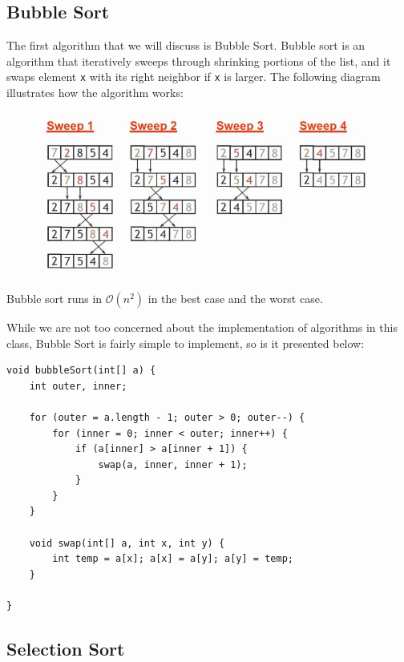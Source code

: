 \newpage

\subsection{Bubble Sort}

The first algorithm that we will discuss is Bubble Sort. Bubble sort is an algorithm that iteratively sweeps through shrinking portions of the list, and it swaps element \verb!x! with its right neighbor if \verb!x! is larger. The following diagram illustrates how the algorithm works:

\begin{figure}[h]
\includegraphics[width=\textwidth]{media/bsort.jpg}
\centering
\end{figure}


Bubble sort runs in $\mathcal{O}(n^2)$ in the best case and the worst case. 

While we are not too concerned about the implementation of algorithms in this class, Bubble Sort is fairly simple to implement, so is it presented below:

\begin{lstlisting}
void bubbleSort(int[] a) {
    int outer, inner;
    
    for (outer = a.length - 1; outer > 0; outer--) {
        for (inner = 0; inner < outer; inner++) {
            if (a[inner] > a[inner + 1]) {
                swap(a, inner, inner + 1);
            }
        }
    }

    void swap(int[] a, int x, int y) {
        int temp = a[x]; a[x] = a[y]; a[y] = temp;
    }

}
\end{lstlisting}

\subsection{Selection Sort}

